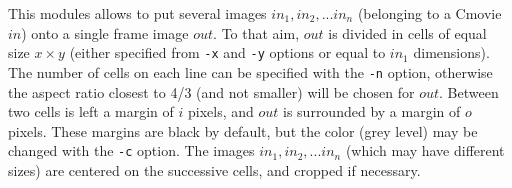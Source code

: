 This modules allows to put several images $in_1, in_2, ...in_n$
(belonging to a Cmovie $in$) onto a single frame image $out$. 
To that aim, $out$ is divided in cells of equal size $x \times y$
(either specified from \verb+-x+ and \verb+-y+ options or
equal to $in_1$ dimensions). The number of cells on each line
can be specified with the \verb+-n+ option, otherwise the aspect
ratio closest to 4/3 (and not smaller) will be chosen for $out$.
Between two cells is left a margin of $i$ pixels, and $out$ is
surrounded by a margin of $o$ pixels. These margins are black 
by default, but the color (grey level) may be changed with the
\verb+-c+ option. The images $in_1, in_2, ...in_n$ (which
may have different sizes) are centered 
on the successive cells, and cropped if necessary.

